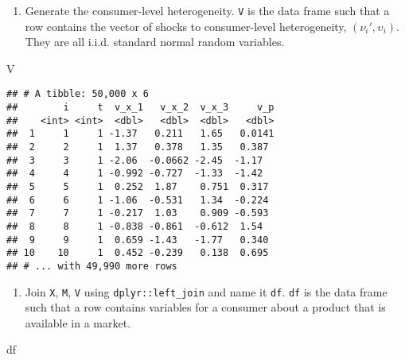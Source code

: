 \documentclass[
]{book}
\newenvironment{Shaded}{\begin{snugshade}}{\end{snugshade}}
\newcommand{\NormalTok}[1]{#1}
\providecommand{\tightlist}{%
  \setlength{\itemsep}{0pt}\setlength{\parskip}{0pt}}
\begin{document}
\begin{enumerate}
\def\labelenumi{\arabic{enumi}.}
\setcounter{enumi}{3}
\tightlist
\item
  Generate the consumer-level heterogeneity. \texttt{V} is the data frame such that a row contains the vector of shocks to consumer-level heterogeneity, \((\nu_{i}', \upsilon_i)\). They are all i.i.d. standard normal random variables.
\end{enumerate}

\begin{Shaded}
\begin{Highlighting}[]
\NormalTok{V}
\end{Highlighting}
\end{Shaded}

\begin{verbatim}
## # A tibble: 50,000 x 6
##        i     t  v_x_1   v_x_2  v_x_3     v_p
##    <int> <int>  <dbl>   <dbl>  <dbl>   <dbl>
##  1     1     1 -1.37   0.211   1.65   0.0141
##  2     2     1  1.37   0.378   1.35   0.387 
##  3     3     1 -2.06  -0.0662 -2.45  -1.17  
##  4     4     1 -0.992 -0.727  -1.33  -1.42  
##  5     5     1  0.252  1.87    0.751  0.317 
##  6     6     1 -1.06  -0.531   1.34  -0.224 
##  7     7     1 -0.217  1.03    0.909 -0.593 
##  8     8     1 -0.838 -0.861  -0.612  1.54  
##  9     9     1  0.659 -1.43   -1.77   0.340 
## 10    10     1  0.452 -0.239   0.138  0.695 
## # ... with 49,990 more rows
\end{verbatim}

\begin{enumerate}
\def\labelenumi{\arabic{enumi}.}
\setcounter{enumi}{4}
\tightlist
\item
  Join \texttt{X}, \texttt{M}, \texttt{V} using \texttt{dplyr::left\_join} and name it \texttt{df}. \texttt{df} is the data frame such that a row contains variables for a consumer about a product that is available in a market.
\end{enumerate}

\begin{Shaded}
\begin{Highlighting}[]
\NormalTok{df}
\end{Highlighting}
\end{Shaded}
\end{document}
